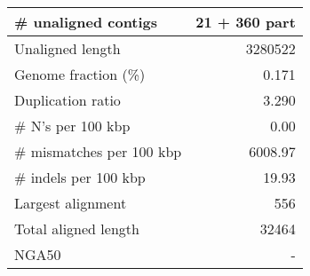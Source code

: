 \documentclass[12pt,a4paper]{article}
\begin{document}
\begin{table}[ht]
\begin{center}
\begin{tabular}{|l*{1}{|r}|}
\# unaligned contigs & 21 + 360 part \\ \hline
Unaligned length & 3280522 \\ \hline
Genome fraction (\%) & 0.171 \\ \hline
Duplication ratio & 3.290 \\ \hline
\# N's per 100 kbp & 0.00 \\ \hline
\# mismatches per 100 kbp & 6008.97 \\ \hline
\# indels per 100 kbp & 19.93 \\ \hline
Largest alignment & 556 \\ \hline
Total aligned length & 32464 \\ \hline
NGA50 & - \\ \hline
\end{tabular}
\end{center}
\end{table}
\end{document}
